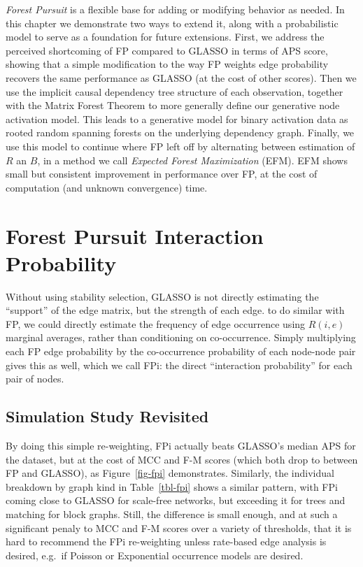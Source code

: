 \documentclass[%
	12pt,
		oneside,
		letterpaper
]{book}
\begin{document}
\emph{Forest Pursuit} is a flexible base for adding or modifying
behavior as needed. In this chapter we demonstrate two ways to extend
it, along with a probabilistic model to serve as a foundation for future
extensions. First, we address the perceived shortcoming of FP compared
to GLASSO in terms of APS score, showing that a simple modification to
the way FP weights edge probability recovers the same performance as
GLASSO (at the cost of other scores). Then we use the implicit causal
dependency tree structure of each observation, together with the Matrix
Forest Theorem
\autocite{MatrixForestTheorem_Chebotarev2006,Countingrootedforests_Knill2013}
to more generally define our generative node activation model. This
leads to a generative model for binary activation data as rooted random
spanning forests on the underlying dependency graph. Finally, we use
this model to continue where FP left off by alternating between
estimation of \(R\) an \(B\), in a method we call \emph{Expected Forest
Maximization} (EFM). EFM shows small but consistent improvement in
performance over FP, at the cost of computation (and unknown
convergence) time.

\section{Forest Pursuit Interaction Probability}\label{sec-fpi}

Without using stability
selection\autocite{StabilitySelection_Meinshausen2010}, GLASSO is not
directly estimating the ``support'' of the edge matrix, but the strength
of each edge. to do similar with FP, we could directly estimate the
frequency of edge occurrence using \(R(i,e)\) marginal averages, rather
than conditioning on co-occurrence. Simply multiplying each FP edge
probability by the co-occurrence probability of each node-node pair
gives this as well, which we call FPi: the direct ``interaction
probability'' for each pair of nodes.

\subsection{Simulation Study
Revisited}\label{simulation-study-revisited}

By doing this simple re-weighting, FPi actually beats GLASSO's median
APS for the dataset, but at the cost of MCC and F-M scores (which both
drop to between FP and GLASSO), as Figure~\ref{fig-fpi} demonstrates.
Similarly, the individual breakdown by graph kind in Table~\ref{tbl-fpi}
shows a similar pattern, with FPi coming close to GLASSO for scale-free
networks, but exceeding it for trees and matching for block graphs.
Still, the difference is small enough, and at such a significant penaly
to MCC and F-M scores over a variety of thresholds, that it is hard to
recommend the FPi re-weighting unless rate-based edge analysis is
desired, e.g.~if Poisson or Exponential occurrence models are desired.
\end{document}
